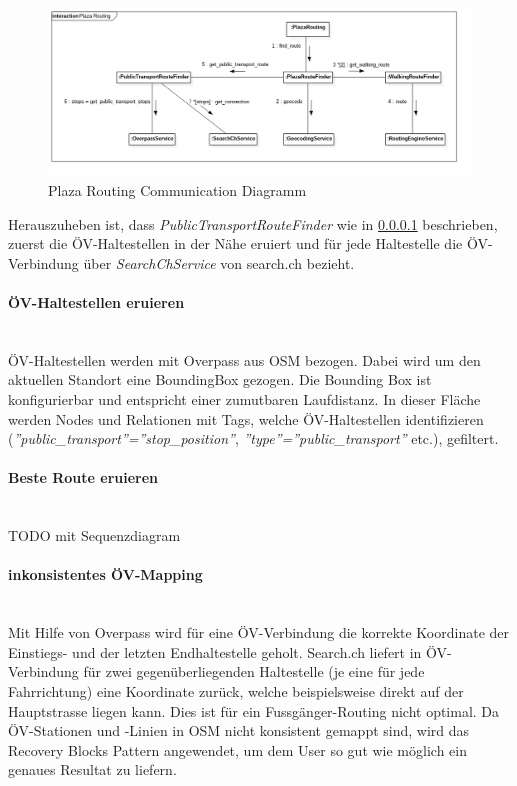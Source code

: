\begin{figure}[ht]
    \centering
    \includegraphics[width=1\linewidth]{projectdoc/img/communication_diagram}
    \caption[Plaza Routing Collaboration Diagramm]{Plaza Routing Communication Diagramm}
    \label{fig:communication_diagram}
\end{figure}

Herauszuheben ist, dass \emph{PublicTransportRouteFinder} wie in \ref{impl:Plaza Routing ÖV-Haltestellen eruieren} beschrieben, zuerst die ÖV-Haltestellen in der Nähe eruiert und für jede Haltestelle die ÖV-Verbindung über \emph{SearchChService} von search.ch \cite{search_ch_route_api} bezieht.

\paragraph{ÖV-Haltestellen eruieren}\label{impl:Plaza Routing ÖV-Haltestellen eruieren}~\\
ÖV-Haltestellen werden mit Overpass \cite{wiki:overpass} aus \ac{OSM} bezogen. Dabei wird um den aktuellen Standort eine \gls{BoundingBox} gezogen. Die Bounding Box ist konfigurierbar und entspricht einer zumutbaren Laufdistanz. In dieser Fläche werden Nodes und Relationen mit Tags, welche ÖV-Haltestellen identifizieren (\emph{''public\_transport''=''stop\_position''}, \emph{''type''=''public\_transport''} etc.), gefiltert.

\paragraph{Beste Route eruieren}\label{impl:Plaza Routing Beste Route eruieren}~\\
TODO mit Sequenzdiagram

\paragraph{inkonsistentes ÖV-Mapping}\label{impl:Plaza Routing inkonsistentes ÖV-Mapping}~\\
Mit Hilfe von Overpass \cite{wiki:overpass} wird für eine ÖV-Verbindung die korrekte Koordinate der Einstiegs- und der letzten Endhaltestelle geholt. Search.ch \cite{search_ch_route_api} liefert in ÖV-Verbindung für zwei gegenüberliegenden Haltestelle (je eine für jede Fahrrichtung) eine Koordinate zurück, welche beispielsweise direkt auf der Hauptstrasse liegen kann. Dies ist für ein Fussgänger-Routing nicht optimal.
Da ÖV-Stationen und -Linien in \ac{OSM} nicht konsistent gemappt sind, wird das Recovery Blocks Pattern \cite{fault_tolerant_software} angewendet, um dem User so gut wie möglich ein genaues Resultat zu liefern.
